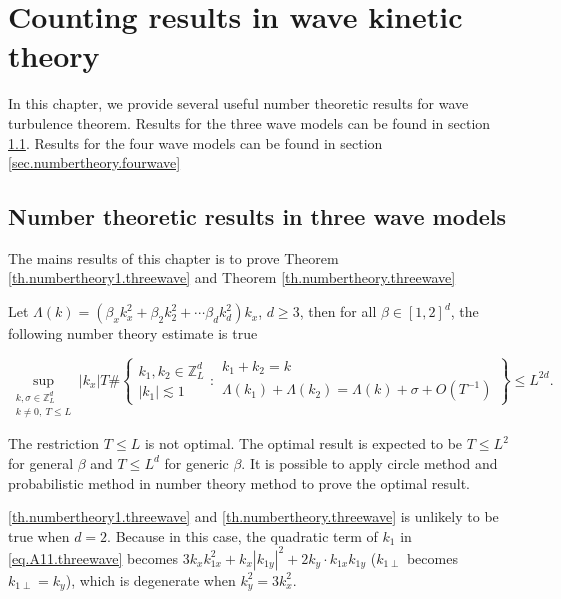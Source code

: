 \chapter{Counting results in wave kinetic theory}\label{chapter.numbertheory}

In this chapter, we provide several useful number theoretic results for wave turbulence theorem. Results for the three wave models can be found in section \ref{sec.numbertheoryA.threewave}. Results for the four wave models can be found in section \ref{sec.numbertheory.fourwave}


\section{Number theoretic results in three wave models}\label{sec.numbertheoryA.threewave}
The mains results of this chapter is to prove Theorem \ref{th.numbertheory1.threewave} and Theorem \ref{th.numbertheory.threewave} 

\begin{thm}\label{th.numbertheory1.threewave}
Let $\Lambda(k)=(\beta_x k_x^2+\beta_2 k_2^2+\cdots\beta_d k_d^2)k_x$, $d\ge 3$, then for all $\beta\in [1,2]^d$, the following number theory estimate is true

\begin{equation}\label{eq.numbertheory1.threewave}
    \sup_{\substack{k,\sigma\in\mathbb{Z}_L^d\\k\ne 0,\ T\le L}} |k_x|T\#\left
    \{\begin{matrix}
k_1,k_2\in\mathbb{Z}_L^d \\
|k_1|\lesssim 1
\end{matrix}
:
\begin{matrix}
k_1+k_2=k \\
\Lambda(k_1)+\Lambda(k_2)=\Lambda(k)+\sigma+O(T^{-1})
\end{matrix}
\right\}\le L^{2d}.
\end{equation}


\end{thm}

\begin{rem}
The restriction $T\le L$ is not optimal. The optimal result is expected to be $T\le L^2$ for general $\beta$ and $T\le L^{d}$ for generic $\beta$. It is possible to apply circle method and probabilistic method in number theory method to prove the optimal result.
\end{rem}

\begin{rem}\label{rem.nottrue2d.threewave}
\ref{th.numbertheory1.threewave} and \ref{th.numbertheory.threewave} is unlikely to be true when $d=2$. Because in this case, the quadratic term of $k_1$ in \eqref{eq.A11.threewave} becomes $3k_xk_{1x}^2+k_x|k_{1y}|^2+2k_{y}\cdot k_{1x} k_{1y}$ ($k_{1\perp}$ becomes $k_{1\perp}=k_y$), which is degenerate when $k_{y}^2=3k_x^2$. 
\end{rem}

